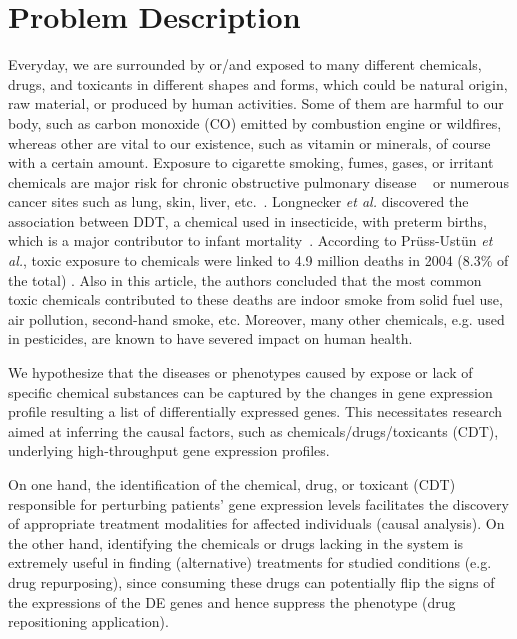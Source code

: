 \section{Problem Description}
\label{chap:ProblemDescription}

Everyday, we are surrounded by or/and exposed to many different chemicals, drugs, and toxicants in different shapes and forms, which could be natural origin, raw material, or produced by human activities. Some of them are harmful to our body, such as  carbon monoxide (CO) emitted by combustion engine or wildfires, whereas other are vital to our existence, such as vitamin or minerals, of course with a certain amount. Exposure to cigarette smoking, fumes, gases, or irritant chemicals are major risk for chronic obstructive pulmonary disease ~\cite{boschetto2006chronic} or numerous cancer sites such as lung, skin, liver, etc.~\cite{clapp2008environmental}. Longnecker \textit{et al.} discovered the association between DDT, a chemical used in insecticide, with preterm births, which is a major contributor to infant mortality~\cite{longnecker2001association}.
According to Prüss-Ustün \textit{et al.}, toxic exposure to chemicals were linked to 4.9 million deaths in 2004 (8.3\% of the total) \cite{pruss2011knowns}. Also in this article, the authors concluded that the most common toxic chemicals contributed to these deaths are indoor smoke from solid fuel use, air pollution, second-hand smoke, etc. Moreover, many other chemicals, e.g. used in pesticides, are known to have severed impact on human health.

We hypothesize that the diseases or phenotypes caused by expose or lack of specific chemical substances can be captured by the changes in gene expression profile resulting a list of differentially expressed genes.
This necessitates research aimed at inferring the causal factors, such as chemicals/drugs/toxicants (CDT), underlying high-throughput gene expression profiles.

On one hand, the identification of the chemical, drug, or toxicant (CDT) responsible for perturbing patients' gene expression levels facilitates the discovery of appropriate treatment modalities for affected individuals (causal analysis).
On the other hand, identifying the chemicals or drugs lacking in the system is extremely useful in finding (alternative) treatments for studied conditions (e.g. drug repurposing), since consuming these drugs can potentially flip the signs of the expressions of the DE genes and hence suppress the phenotype (drug repositioning application).